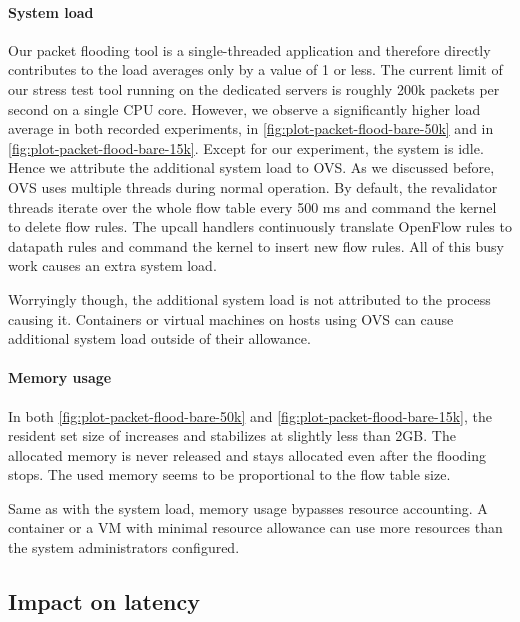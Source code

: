 \paragraph{System load}
Our packet flooding tool is a single-threaded application and therefore directly contributes to the load averages only by a value of 1 or less. The current limit of our stress test tool running on the dedicated servers is roughly 200k packets per second on a single CPU core. However, we observe a significantly higher load average in both recorded experiments, in \cref{fig:plot-packet-flood-bare-50k} and in \cref{fig:plot-packet-flood-bare-15k}. Except for our experiment, the system is idle. Hence we attribute the additional system load to OVS. As we discussed before, OVS uses multiple threads during normal operation. By default, the revalidator threads iterate over the whole flow table every 500 \si{\milli\second} and command the kernel to delete flow rules. The upcall handlers continuously translate OpenFlow rules to datapath rules and command the kernel to insert new flow rules. All of this busy work causes an extra system load.

Worryingly though, the additional system load is not attributed to the process causing it. Containers or virtual machines on hosts using OVS can cause additional system load outside of their allowance.

\paragraph{Memory usage}
In both \cref{fig:plot-packet-flood-bare-50k} and \cref{fig:plot-packet-flood-bare-15k}, the resident set size of  increases and stabilizes at slightly less than 2GB. The allocated memory is never released and stays allocated even after the flooding stops. The used memory seems to be proportional to the flow table size.

Same as with the system load, memory usage bypasses resource accounting. A container or a VM with minimal resource allowance can use more resources than the system administrators configured.

\subsection{Impact on latency}

